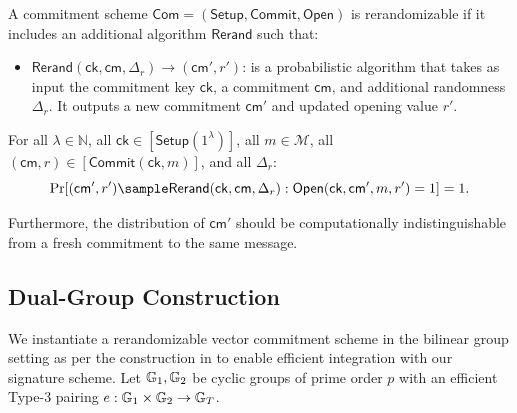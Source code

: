 \begin{definition}[Rerandomizability]
A commitment scheme $\mathsf{Com} = (\mathsf{Setup}, \mathsf{Commit}, \mathsf{Open})$ is rerandomizable if it includes an additional algorithm $\mathsf{Rerand}$ such that:

\begin{itemize}
\item $\mathsf{Rerand}(\mathsf{ck}, \mathsf{cm}, \Delta_r) \rightarrow (\mathsf{cm}', r')$: is a probabilistic algorithm that takes as input the commitment key $\mathsf{ck}$, a commitment $\mathsf{cm}$, and additional randomness $\Delta_r$. It outputs a new commitment $\mathsf{cm}'$ and updated opening value $r'$.
\end{itemize}

For all $\lambda \in \mathbb{N}$, all $\mathsf{ck} \in [\mathsf{Setup}(1^\lambda)]$, all $m \in \mathcal{M}$, all $(\mathsf{cm}, r) \in [\mathsf{Commit}(\mathsf{ck}, m)]$, and all $\Delta_r$:
$$\Pr[(\mathsf{cm}', r') \sample \mathsf{Rerand}(\mathsf{ck}, \mathsf{cm}, \Delta_r) : \mathsf{Open}(\mathsf{ck}, \mathsf{cm}', m, r') = 1] = 1.$$

Furthermore, the distribution of $\mathsf{cm}'$ should be computationally indistinguishable from a fresh commitment to the same message.
\end{definition}


\subsection{Dual-Group Construction}

We instantiate a rerandomizable vector commitment scheme in the bilinear group setting as per the construction in \cite{tomescu_utt_2022} to enable efficient integration with our signature scheme. Let $\mathbb{G}_1, \mathbb{G}_2$ be cyclic groups of prime order $p$ with an efficient Type-3 pairing $e: \mathbb{G}_1 \times \mathbb{G}_2 \to \mathbb{G}_T$.

